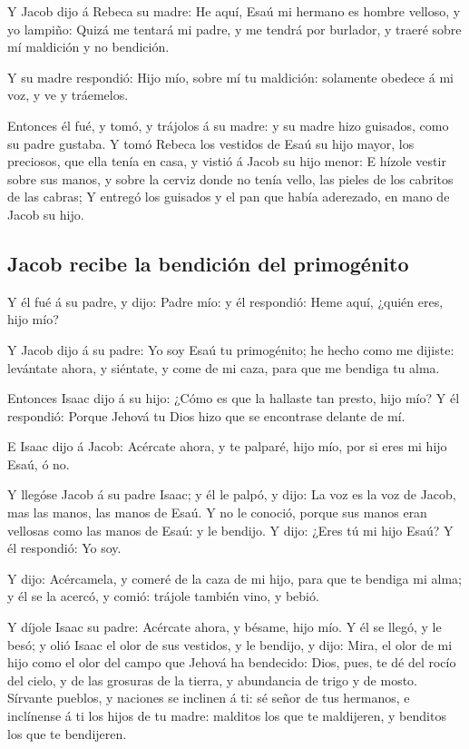  Y Jacob dijo á Rebeca su madre: He aquí, Esaú mi hermano
es hombre velloso, y yo lampiño:  Quizá me tentará mi
padre, y me tendrá por burlador, y traeré sobre mí maldición y no
bendición.

 Y su madre respondió: Hijo mío, sobre mí tu maldición:
solamente obedece á mi voz, y ve y tráemelos.

 Entonces él fué, y tomó, y trájolos á su madre: y su
madre hizo guisados, como su padre gustaba.  Y tomó
Rebeca los vestidos de Esaú su hijo mayor, los preciosos, que ella tenía
en casa, y vistió á Jacob su hijo menor:  E hízole vestir
sobre sus manos, y sobre la cerviz donde no tenía vello, las pieles de
los cabritos de las cabras;  Y entregó los guisados y el
pan que había aderezado, en mano de Jacob su hijo.

\hypertarget{jacob-recibe-la-bendiciuxf3n-del-primoguxe9nito}{%
\subsection{Jacob recibe la bendición del
primogénito}\label{jacob-recibe-la-bendiciuxf3n-del-primoguxe9nito}}

 Y él fué á su padre, y dijo: Padre mío: y él respondió:
Heme aquí, ¿quién eres, hijo mío?

 Y Jacob dijo á su padre: Yo soy Esaú tu primogénito; he
hecho como me dijiste: levántate ahora, y siéntate, y come de mi caza,
para que me bendiga tu alma.

 Entonces Isaac dijo á su hijo: ¿Cómo es que la hallaste
tan presto, hijo mío? Y él respondió: Porque Jehová tu Dios hizo que se
encontrase delante de mí.

 E Isaac dijo á Jacob: Acércate ahora, y te palparé, hijo
mío, por si eres mi hijo Esaú, ó no.

 Y llegóse Jacob á su padre Isaac; y él le palpó, y dijo:
La voz es la voz de Jacob, mas las manos, las manos de Esaú.
 Y no le conoció, porque sus manos eran vellosas como las
manos de Esaú: y le bendijo.  Y dijo: ¿Eres tú mi hijo
Esaú? Y él respondió: Yo soy.

 Y dijo: Acércamela, y comeré de la caza de mi hijo, para
que te bendiga mi alma; y él se la acercó, y comió: trájole también
vino, y bebió.

 Y díjole Isaac su padre: Acércate ahora, y bésame, hijo
mío.  Y él se llegó, y le besó; y olió Isaac el olor de
sus vestidos, y le bendijo, y dijo: Mira, el olor de mi hijo como el
olor del campo que Jehová ha bendecido:  Dios, pues, te
dé del rocío del cielo, y de las grosuras de la tierra, y abundancia de
trigo y de mosto.  Sírvante pueblos, y naciones se
inclinen á ti: sé señor de tus hermanos, e inclínense á ti los hijos de
tu madre: malditos los que te maldijeren, y benditos los que te
bendijeren.

